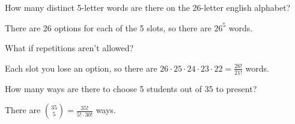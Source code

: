 \begin{eg}
	How many distinct 5-letter words are there on the 26-letter english alphabet?
\end{eg}
\begin{explanation}
	There are 26 options for each of the 5 slots, so there are \( 26^5 \) words.
\end{explanation}

\begin{eg}
	What if repetitions aren't allowed?
\end{eg}
\begin{explanation}
	Each slot you lose an option, so there are \( 26 \cdot 25 \cdot 24 \cdot 23 \cdot 22 = \frac{26!}{21!}\) words.
\end{explanation}

\begin{eg}
	How many ways are there to choose 5 students out of 35 to present?
\end{eg}
\begin{explanation}
	There are \( \binom{35}{5} = \frac{35!}{5! \cdot 30!} \) ways.
\end{explanation}
